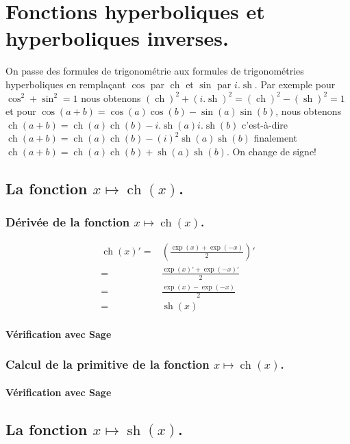 \documentclass[a4paper,14pt]{extreport} %
\renewcommand{\sinh}{\mathop{\mathrm{sh}}}
\renewcommand{\cosh}{\mathop{\mathrm{ch}}}
\begin{document}
\chapter{Fonctions hyperboliques et hyperboliques inverses.}


On passe des formules de trigonométrie aux formules de trigonométries hyperboliques en remplaçant $\cos$ par $\cosh$ et $\sin$ par $i . \sinh$. Par exemple pour $\cos^2+\sin^2=1$
nous obtenons $(\cosh)^2 + (i . \sinh)^2= (\cosh)^2 - (\sinh)^2 = 1$ et pour $\cos(a+b)=\cos(a) \cos(b) - \sin(a) \sin(b) $, nous obtenons $\cosh(a+b)=\cosh(a) \cosh(b) - i .\sinh(a) i . \sinh(b) $ c'est-à-dire $\cosh(a+b)=\cosh(a) \cosh(b) - (i)^2 \sinh(a) \sinh(b) $ finalement $\cosh(a+b) = \cosh(a) \cosh(b) + \sinh(a) \sinh(b) $. On change de signe!



\section{La fonction  $x \mapsto \cosh(x)$.}

\subsection{Dérivée de la fonction $x \mapsto \cosh(x)$.}
\begin{align*}
\cosh(x)' =& \left( \frac{\exp(x)+\exp(-x)}{2} \right)' \\ =& \frac{\exp(x)'+\exp(-x)'}{2} \\=& \frac{\exp(x)-\exp(-x)}{2} \\=& \sinh(x)
\end{align*}


\subsubsection{Vérification avec Sage}

\subsection{Calcul de la primitive de la fonction  $x \mapsto \cosh(x)$.}

\subsubsection{Vérification avec Sage}



\section{La fonction  $x \mapsto \sinh(x)$.}
\end{document}
